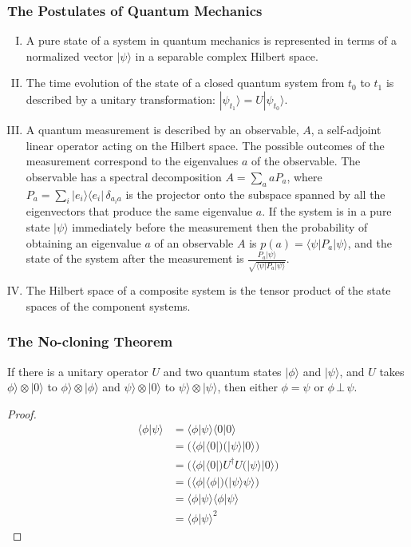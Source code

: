 \documentclass[UTF8,11pt,colorlinks,compress,openany]{beamer}%
\begin{document}
\begin{frame}\frametitle{The Postulates of Quantum Mechanics}
\begin{enumerate}[I.]
	\item A pure state of a system in quantum mechanics is represented in terms of a normalized vector $|\psi\rangle$ in a separable complex Hilbert space.
	\item The time evolution of the state of a closed quantum system from $t_0$ to $t_1$ is described by a unitary transformation: $|\psi_{t_1}\rangle = U|\psi_{t_0}\rangle$.
	\item A quantum measurement is described by an observable, $A$, a self-adjoint linear operator acting on the Hilbert space. The possible outcomes of the measurement correspond to the eigenvalues $a$ of the observable. The observable has a spectral decomposition $A=\sum\limits_a aP_a$, where $P_a=\sum\limits_i|e_i\rangle\langle e_i|\,\delta_{a_ia}$ is the projector onto the subspace spanned by all the eigenvectors that produce the same eigenvalue $a$. If the system is in a pure state $|\psi\rangle$ immediately before the measurement then the probability of obtaining an eigenvalue $a$ of an observable $A$ is $p(a)=\langle\psi|P_a|\psi\rangle$, and the state of the system after the measurement is $\frac{P_a|\psi\rangle}{\sqrt{\langle\psi|P_a|\psi\rangle}}$.
	\item The Hilbert space of a composite system is the tensor product of the state spaces of the component systems.
\end{enumerate}
\end{frame}

\begin{frame}\frametitle{The No-cloning Theorem}
	\begin{theorem}
	If there is a unitary operator $U$ and two quantum states $|\phi\rangle$ and $|\psi\rangle$, and $U$ takes $\phi\rangle\otimes|0\rangle$ to $\phi\rangle\otimes|\phi\rangle$ and $\psi\rangle\otimes|0\rangle$ to $\psi\rangle\otimes|\psi\rangle$, then either $\phi=\psi$ or $\phi\,\bot\,\psi$.
\end{theorem}
\begin{proof}
\begin{align*}
	\langle \phi|\psi\rangle&=\langle \phi|\psi\rangle\langle 0|0\rangle\\
	&=\big(\langle\phi|\langle 0|\big)\big(|\psi\rangle|0\rangle\big)\\
	&=\big(\langle\phi|\langle 0|\big) U^\dagger U\big(|\psi\rangle|0\rangle\big)\\
	&=\big(\langle\phi|\langle\phi|\big)\big(|\psi\rangle\psi\rangle\big)\\
	&=\langle\phi|\psi\rangle\langle\phi|\psi\rangle\\
	&=\langle\phi|\psi\rangle^2
\end{align*}
\end{proof}
\end{frame}
\end{document}
